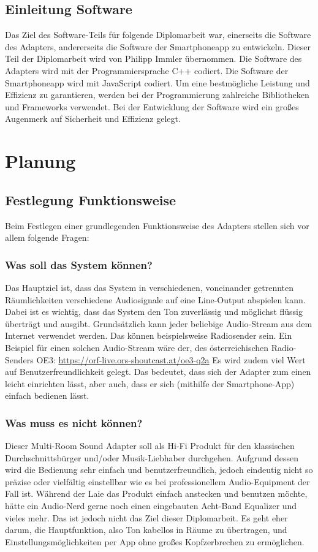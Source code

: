 \documentclass[]{article}
\begin{document}
\subsection{Einleitung Software}
Das Ziel des Software-Teils für folgende Diplomarbeit war, einerseits die Software des Adapters, andererseits die Software der Smartphoneapp zu entwickeln. Dieser Teil der Diplomarbeit wird von Philipp Immler übernommen. Die Software des Adapters wird mit der Programmiersprache C++ codiert. Die Software der Smartphoneapp wird mit JavaScript codiert. Um eine bestmögliche Leistung und Effizienz zu garantieren, werden bei der Programmierung zahlreiche Bibliotheken und Frameworks verwendet. Bei der Entwicklung der Software wird ein großes Augenmerk auf Sicherheit und Effizienz gelegt. 

\section{Planung}
\subsection{Festlegung Funktionsweise}
Beim Festlegen einer grundlegenden Funktionsweise des Adapters stellen sich vor allem folgende Fragen:
\subsubsection{Was soll das System können?}
Das Hauptziel ist, dass das System in verschiedenen, voneinander getrennten Räumlichkeiten verschiedene Audiosignale auf eine Line-Output abspielen kann. Dabei ist es wichtig, dass das System den Ton zuverlässig und möglichst flüssig überträgt und ausgibt. \newline 
Grundsätzlich kann jeder beliebige Audio-Stream aus dem Internet verwendet werden. Das können beispielsweise Radiosender sein.
Ein Beispiel für einen solchen Audio-Stream wäre der, des österreichischen Radio-Senders \glqq OE3\grqq{}: \newline
\url{https://orf-live.ors-shoutcast.at/oe3-q2a}
\vspace{4mm} \newline
Es wird zudem viel Wert auf Benutzerfreundlichkeit gelegt. Das bedeutet, dass sich der Adapter zum einen leicht einrichten lässt, aber auch, dass er sich (mithilfe der Smartphone-App) einfach bedienen lässt.
\subsubsection{Was muss es nicht können?}
Dieser Multi-Room Sound Adapter soll als Hi-Fi Produkt für den klassischen Durchschnittsbürger und/oder Musik-Liebhaber durchgehen. Aufgrund dessen wird die Bedienung sehr einfach und benutzerfreundlich, jedoch eindeutig nicht so präzise oder vielfältig einstellbar wie es bei professionellem Audio-Equipment der Fall ist. Während der Laie das Produkt einfach anstecken und benutzen möchte, hätte ein Audio-Nerd gerne noch einen eingebauten Acht-Band Equalizer und vieles mehr. Das ist jedoch nicht das Ziel dieser Diplomarbeit. Es geht eher darum, die Hauptfunktion, also Ton kabellos in Räume zu übertragen, und Einstellungsmöglichkeiten per App ohne großes Kopfzerbrechen zu ermöglichen.
\end{document}
